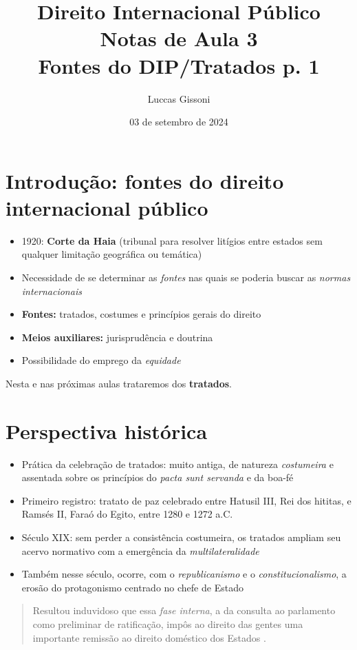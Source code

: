 \documentclass{article}
\title{%
  Direito Internacional Público \\
  \Large Notas de Aula 3\\
  \Large Fontes do DIP/Tratados p. 1\\
  }
\author{Luccas Gissoni}
\date{03 de setembro de 2024}
\begin{document}
\maketitle
\tableofcontents

\section{Introdução: fontes do direito internacional público}

\begin{itemize}
    \item 1920: \textbf{Corte da Haia} (tribunal para resolver litígios entre estados sem qualquer limitação geográfica ou temática)
    \item Necessidade de se determinar as \textit{fontes} nas quais se poderia buscar as \textit{normas internacionais}
    \item \textbf{Fontes:} tratados, costumes e princípios gerais do direito
    \item \textbf{Meios auxiliares:} jurisprudência e doutrina
    \item Possibilidade do emprego da \textit{equidade}
\end{itemize}

Nesta e nas próximas aulas trataremos dos \textbf{tratados}.

\section{Perspectiva histórica}

\begin{itemize}
    \item Prática da celebração de tratados: muito antiga, de natureza \textit{costumeira} e assentada sobre os princípios do \textit{pacta sunt servanda} e da boa-fé
    \item Primeiro registro: tratato de paz celebrado entre Hatusil III, Rei dos hititas, e Ramsés II, Faraó do Egito, entre 1280 e 1272 a.C.
    \item Século XIX: sem perder a consistência costumeira, os tratados ampliam seu acervo normativo com a emergência da \textit{multilateralidade}
    \item Também nesse século, ocorre, com o \textit{republicanismo} e o \textit{constitucionalismo}, a erosão do protagonismo centrado no chefe de Estado
\end{itemize}

\begin{quote}
    Resultou induvidoso que essa \textit{fase interna}, a da consulta ao parlamento como preliminar de ratificação, impôs ao direito das gentes uma importante remissão ao direito doméstico dos Estados \cite[p.~12]{rezek_direito_2024}.
\end{quote}
\end{document}
